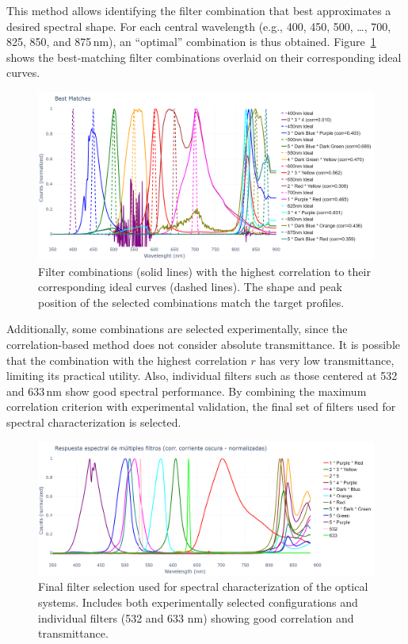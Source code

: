 \noindent This method allows identifying the filter combination that best approximates a desired spectral shape. For each central wavelength (e.g., 400, 450, 500, …, 700, 825, 850, and 875\,nm), an “optimal” combination is thus obtained. Figure~\ref{fig:best_corr_combinations} shows the best-matching filter combinations overlaid on their corresponding ideal curves.

\begin{figure}[H]
    \centering
    \includegraphics[trim=0mm 0mm 0mm 25mm, clip, width=1\textwidth]{Figures/C3/best_matches.png}
    \caption{Filter combinations (solid lines) with the highest correlation to their corresponding ideal curves (dashed lines). The shape and peak position of the selected combinations match the target profiles.}
    \label{fig:best_corr_combinations}
\end{figure}

\medskip

\noindent Additionally, some combinations are selected experimentally, since the correlation-based method does not consider absolute transmittance. It is possible that the combination with the highest correlation \(r\) has very low transmittance, limiting its practical utility. Also, individual filters such as those centered at 532 and 633\,nm show good spectral performance. By combining the maximum correlation criterion with experimental validation, the final set of filters used for spectral characterization is selected.

\begin{figure}[htbp]
    \centering
    \includegraphics[trim= 0mm 0mm 0mm 20mm, clip, width=1\textwidth]{Figures/C3/filt_select.png}
    \caption{Final filter selection used for spectral characterization of the optical systems. Includes both experimentally selected configurations and individual filters (532 and 633 nm) showing good correlation and transmittance.}
    \label{fig:selected_filters}
\end{figure}

